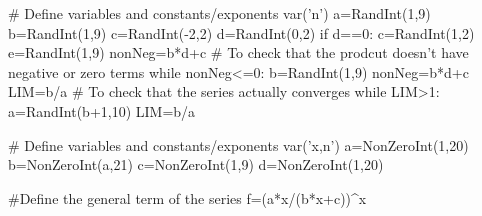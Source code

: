 \begin{sagesilent}
# Define variables and constants/exponents
var('n')
a=RandInt(1,9)
b=RandInt(1,9)
c=RandInt(-2,2)
d=RandInt(0,2)
if d==0:
   c=RandInt(1,2)
e=RandInt(1,9)
nonNeg=b*d+c # To check that the prodcut doesn't have negative or zero terms
while nonNeg<=0:
   b=RandInt(1,9)
   nonNeg=b*d+c
LIM=b/a # To check that the series actually converges
while LIM>1:
   a=RandInt(b+1,10)
   LIM=b/a

\end{sagesilent}


\begin{sagesilent}
# Define variables and constants/exponents
var('x,n')
a=NonZeroInt(1,20)
b=NonZeroInt(a,21)
c=NonZeroInt(1,9)
d=NonZeroInt(1,20)

#Define the general term of the series
f=(a*x/(b*x+c))^x

\end{sagesilent}


